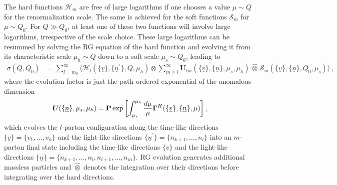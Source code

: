 \documentclass[11pt,a4paper]{article}
\begin{document}
The hard functions $\bm{\mathcal{H}}_m$ are free of large logarithms if one chooses a value $\mu \sim Q$ for the renormalization scale. The same is achieved for the soft functions $\bm{\mathcal{S}}_m$ for $\mu \sim Q_0$. For $Q \gg Q_0$, at least one of these two functions will involve large logarithms, irrespective of the scale choice. These large logarithms can be resummed by solving the RG equation of the hard function and evolving it from its characteristic scale $\mu_h \sim Q$ down to a soft scale  $\mu_s \sim Q_0$, leading to 
\begin{align} \label{eq:crssctEvo}
\sigma(Q, Q_0) &= \sum_{l=m_0}^\infty \big\langle \bm{\mathcal{H}}_l(\{\underline{v}\},\{\underline{n}^\prime\},Q,\mu_h) 
\otimes \sum_{m\geq l}^\infty \bm{U}_{lm}(\{\underline{v}\},\{\underline{n}\},\mu_s,\mu_h)\,\hat{\otimes}\, 
\bm{\mathcal{S}}_m(\{\underline{v}\},\{\underline{n}\},Q_0,\mu_s) \big\rangle \,,
\end{align}
where the evolution factor is just the path-ordered exponential of the anomalous dimension 
\begin{align}
\bm{U}(\{\underline{n}\},\mu_s,\mu_h) = {\rm \bf P} \exp\left[ \int_{\mu_s}^{\mu_h} \frac{d\mu}{\mu} \bm{\Gamma}^{H}(\{\underline{v}\} , \{\underline{n}\},\mu) \right], \label{eq:evolmat}
\end{align}
which evolves the $l$-parton configuration along the time-like directions $\{\underline{v}\}=\{v_{1},\dots , v_k\}$ and the light-like directions $\{\underline{n}^\prime\}=\{n_{k+1},\dots,n_l\}$ into an $m$-parton final state  including  the time-like directions $\{\underline{v}\}$ and the light-like directions $\{\underline{n}\}=\{n_{k+1},\dots,n_l,n_{l+1},\dots,n_m\}$. RG evolution generates additional massless particles and $\hat{\otimes}$ denotes the integration over their directions before integrating over the 
hard directions. 
\end{document}
